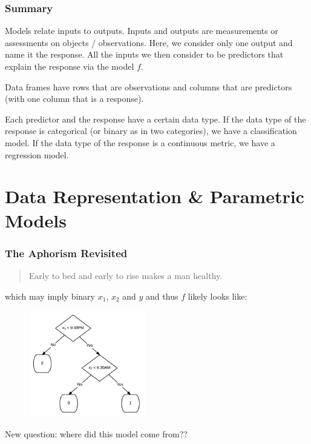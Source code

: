 \documentclass[handout]{beamer}
\begin{document}
\begin{frame}\frametitle{Summary}

Models relate inputs to outputs. Inputs and outputs are measurements or assessments on objects / observations.  Here, we consider only one output and name it the response.  \pause All the inputs we then consider to be predictors that explain the response via the model $f$.  \pause 

Data frames have rows that are observations and columns that are predictors (with one column that is a response).  \pause 

Each predictor and the response have a certain data type.  \pause If the data type of the response is categorical (or binary as in two categories), we have a classification model. If the data type of the response is a continuous metric, we have a regression model.
	
\end{frame}

\section{Data Representation \& Parametric Models}

\begin{frame}\frametitle{The Aphorism Revisited}

\small
\begin{quotation}
Early to bed and early to rise makes a man healthy.
\end{quotation}

which may imply binary $x_1$, $x_2$ and $y$ and thus $f$ likely looks like:

\begin{figure}
\centering
\includegraphics[width=2in]{simple_health}
\end{figure}

New question: where did this model come from??
	
\end{frame}
\end{document}
